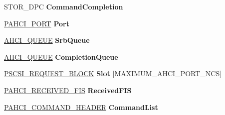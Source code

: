 \begin{DoxyCompactItemize}
\begin{tabbing}
\end{tabbing}\item 
\mbox{\label{struct___a_h_c_i___p_o_r_t___e_x_t_e_n_s_i_o_n_af1fa5bcf5d83c31988e1249d1e9d6c7e}} 
S\+T\+O\+R\+\_\+\+D\+PC {\bfseries Command\+Completion}
\item 
\mbox{\label{struct___a_h_c_i___p_o_r_t___e_x_t_e_n_s_i_o_n_a16eabf96a257446eb4722969ad8dd687}} 
\hyperlink{struct___a_h_c_i___p_o_r_t}{P\+A\+H\+C\+I\+\_\+\+P\+O\+RT} {\bfseries Port}
\item 
\mbox{\label{struct___a_h_c_i___p_o_r_t___e_x_t_e_n_s_i_o_n_afd1c949ef73bedb74aa736f3dbf42ce7}} 
\hyperlink{struct___a_h_c_i___q_u_e_u_e}{A\+H\+C\+I\+\_\+\+Q\+U\+E\+UE} {\bfseries Srb\+Queue}
\item 
\mbox{\label{struct___a_h_c_i___p_o_r_t___e_x_t_e_n_s_i_o_n_a7be550451a73df3fd02d0a530d0776c7}} 
\hyperlink{struct___a_h_c_i___q_u_e_u_e}{A\+H\+C\+I\+\_\+\+Q\+U\+E\+UE} {\bfseries Completion\+Queue}
\item 
\mbox{\label{struct___a_h_c_i___p_o_r_t___e_x_t_e_n_s_i_o_n_ab5e05cb8d115e7c19f30f8cfc664c611}} 
\hyperlink{struct___s_c_s_i___r_e_q_u_e_s_t___b_l_o_c_k}{P\+S\+C\+S\+I\+\_\+\+R\+E\+Q\+U\+E\+S\+T\+\_\+\+B\+L\+O\+CK} {\bfseries Slot} \mbox{[}M\+A\+X\+I\+M\+U\+M\+\_\+\+A\+H\+C\+I\+\_\+\+P\+O\+R\+T\+\_\+\+N\+CS\mbox{]}
\item 
\mbox{\label{struct___a_h_c_i___p_o_r_t___e_x_t_e_n_s_i_o_n_aae125a647bfda40be2a3a01e2e42e860}} 
\hyperlink{struct___a_h_c_i___r_e_c_e_i_v_e_d___f_i_s}{P\+A\+H\+C\+I\+\_\+\+R\+E\+C\+E\+I\+V\+E\+D\+\_\+\+F\+IS} {\bfseries Received\+F\+IS}
\item 
\mbox{\label{struct___a_h_c_i___p_o_r_t___e_x_t_e_n_s_i_o_n_abe3c7b0509f7c87e0054ab52b6823c72}} 
\hyperlink{struct___a_h_c_i___c_o_m_m_a_n_d___h_e_a_d_e_r}{P\+A\+H\+C\+I\+\_\+\+C\+O\+M\+M\+A\+N\+D\+\_\+\+H\+E\+A\+D\+ER} {\bfseries Command\+List}
\item 

\end{DoxyCompactItemize}

